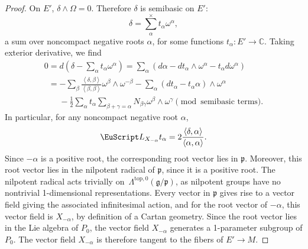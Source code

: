 \documentclass[11pt]{article}
\newcommand{\LieDer}{\ensuremath{\EuScript L}}
\begin{document}
\begin{proof}
On $E'$, $\delta \wedge \Omega = 0$.
Therefore $\delta$ is semibasic on $E'$:
\[
\delta = \sum^{\times}_{\alpha} t_{\alpha} \omega^{\alpha},
\]
a sum over noncompact negative roots $\alpha$, for some
functions $t_{\alpha} : E' \to \mathbb{C}.$
Taking exterior derivative, we f\/ind
\begin{gather*}
0 =
d \left(\delta - \sum _{\alpha} t_{\alpha} \omega^{\alpha} \right)
 = \sum_{\alpha}
\left(
d \alpha
-
dt_{\alpha} \wedge \omega^{\alpha}
- t_{\alpha} d \omega^{\alpha}
\right)
\\
\phantom{0}{} =
-
\sum_{\beta} \frac{\left<\delta,\beta\right>}
{\left<\beta,\beta\right>} \omega^{\beta} \wedge \omega^{-\beta}
-
\sum_{\alpha}
\left(dt_{\alpha} - t_{\alpha} \alpha\right) \wedge \omega^{\alpha}
\\
\phantom{0=}{} - \frac{1}{2}
\sum_{\alpha} t_{\alpha}
\sum_{\beta + \gamma=\alpha} N_{\beta \gamma} \omega^{\beta} \wedge \omega^{\gamma}
\pmod{\text{semibasic terms}}.
\end{gather*}
In particular, for any noncompact negative root $\alpha$,
\[
\LieDer_{X_{-\alpha}} t_{\alpha} = 2 \frac{\left<\delta,\alpha\right>}{\left<\alpha,\alpha\right>}.
\]
Since $-\alpha$ is a positive root, the corresponding root vector
lies in $\mathfrak{p}$. Moreover, this root vector lies in the
nilpotent radical of $\mathfrak{p}$, since it is a positive root.
The nilpotent radical acts trivially on~$\Lambda^{\text{top},0}\left(\mathfrak{g}/\mathfrak{p}\right)$,
as nilpotent groups have no nontrivial 1-dimensional representations.
Every vector in $\mathfrak{p}$ gives rise to a vector f\/ield
giving the associated inf\/initesimal action, and for the root
vector of $-\alpha$, this vector f\/ield is $X_{-\alpha}$,
by def\/inition of a Cartan geometry. Since the root
vector lies in the Lie algebra of $P_0$, the vector f\/ield
$X_{-\alpha}$ generates a 1-parameter subgroup of $P_0$.
The vector f\/ield $X_{-\alpha}$ is therefore
tangent to the f\/ibers of $E' \to M$.


\end{proof}
\end{document}
